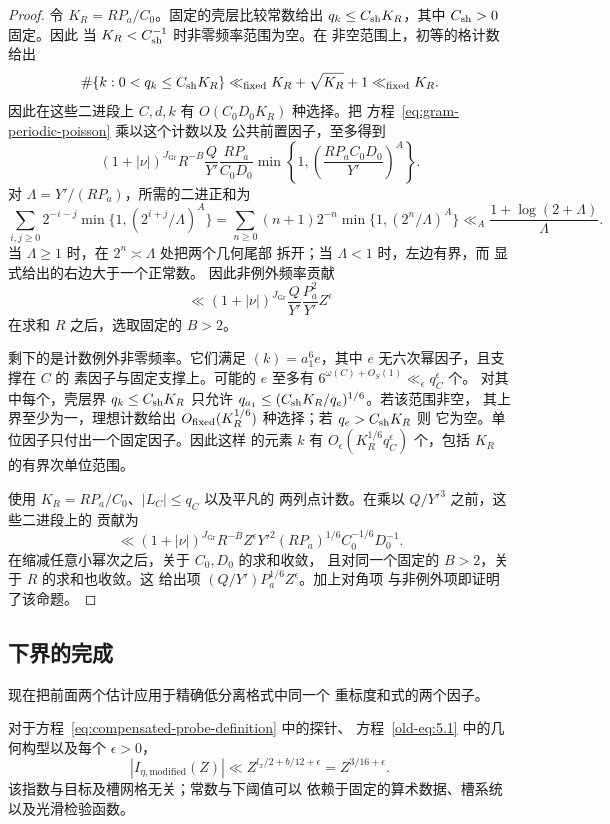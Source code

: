 \begin{proof}
令 $K_R=RP_a/C_0$。固定的壳层比较常数给出
$q_k\le C_{\rm sh}K_R$，其中 $C_{\rm sh}>0$ 固定。因此
当 $K_R<C_{\rm sh}^{-1}$ 时非零频率范围为空。在
非空范围上，初等的格计数给出
\[
 \#\{k:0<q_k\le C_{\rm sh}K_R\}
       \ll_{\rm fixed}K_R+\sqrt{K_R}+1\ll_{\rm fixed}K_R.
\]
因此在这些二进段上 $C,d,k$ 有 $O(C_0D_0K_R)$ 种选择。把
方程~\eqref{eq:gram-periodic-poisson} 乘以这个计数以及
公共前置因子，至多得到
\[
 (1+|\nu|)^{J_{\mathrm{Gr}}} R^{-B}\frac Q{Y'}\frac{RP_a}{C_0D_0}
       \min\left\{1,\left(\frac{RP_aC_0D_0}{Y'}\right)^A\right\}.
\]
对 $\Lambda=Y'/(RP_a)$，所需的二进正和为
\[
 \sum_{i,j\ge0}2^{-i-j}\min\{1,(2^{i+j}/\Lambda)^A\}
 =\sum_{n\ge0}(n+1)2^{-n}\min\{1,(2^n/\Lambda)^A\}
 \ll_A\frac{1+\log(2+\Lambda)}{\Lambda}.
\]
当 $\Lambda\ge1$ 时，在 $2^n\asymp\Lambda$ 处把两个几何尾部
拆开；当 $\Lambda<1$ 时，左边有界，而
显式给出的右边大于一个正常数。
因此非例外频率贡献
\[
 \ll (1+|\nu|)^{J_{\mathrm{Gr}}}\frac Q{Y'}\frac{P_a^2}{Y'}Z^\epsilon
\]
在求和 $R$ 之后，选取固定的 $B>2$。

剩下的是计数例外非零频率。它们满足
$(k)=a_1^6e$，其中 $e$ 无六次幂因子，且支撑在 $C$ 的
素因子与固定支撑上。可能的 $e$ 至多有
$6^{\omega(C)+O_S(1)}\ll_\epsilon q_C^\epsilon$ 个。
对其中每个，壳层界 $q_k\le C_{\rm sh}K_R$ 只允许
$q_{a_1}\le(C_{\rm sh}K_R/q_e)^{1/6}$。若该范围非空，
其上界至少为一，理想计数给出
$O_{\rm fixed}(K_R^{1/6})$ 种选择；若 $q_e>C_{\rm sh}K_R$ 则
它为空。单位因子只付出一个固定因子。因此这样
的元素 $k$ 有 $O_\epsilon(K_R^{1/6}q_C^\epsilon)$ 个，包括
$K_R$ 的有界次单位范围。

使用 $K_R=RP_a/C_0$、$|L_C|\le q_C$ 以及平凡的
两列点计数。在乘以 $Q/Y'^3$ 之前，这些二进段上的
贡献为
\[
 \ll (1+|\nu|)^{J_{\mathrm{Gr}}} R^{-B}Z^\epsilon
       Y'^2(RP_a)^{1/6}C_0^{-1/6}D_0^{-1}.
\]
在缩减任意小幂次之后，关于 $C_0,D_0$ 的求和收敛，
且对同一个固定的 $B>2$，关于 $R$ 的求和也收敛。这
给出项 $(Q/Y')P_a^{1/6}Z^\epsilon$。加上对角项
与非例外项即证明了该命题。
\end{proof}

\subsection{下界的完成}

现在把前面两个估计应用于精确低分离格式中同一个
重标度和式的两个因子。

\begin{proposition}[补偿的低估计]\label{prop:probe-low}
对于方程~\eqref{eq:compensated-probe-definition} 中的探针、
方程~\eqref{old-eq:5.1} 中的几何构型以及每个
$\epsilon>0$，
\begin{equation}
 |I_{\eta,\mathrm{modified}}(Z)|
       \ll Z^{l_x/2+b/12+\epsilon}=Z^{3/16+\epsilon}.
 \label{old-eq:5.10}
\end{equation}
该指数与目标及槽网格无关；常数与下阈值可以
依赖于固定的算术数据、槽系统以及光滑检验函数。
\end{proposition}

